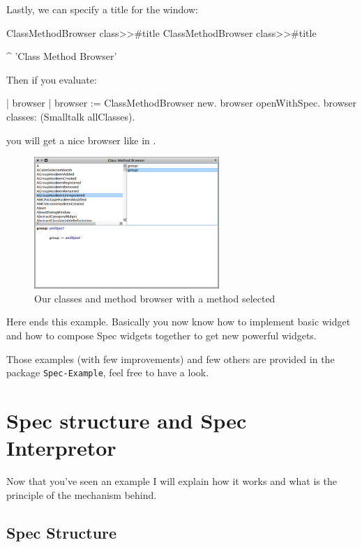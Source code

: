 \documentclass[a4paper,10pt,twoside]{book}
\begin{document}
Lastly, we can specify a title for the window:
\begin{method}{ClassMethodBrowser class>>\#title}
ClassMethodBrowser class>>#title

	^ 'Class Method Browser'
\end{method}

Then if you evaluate:

\begin{code}{}
| browser |
browser := ClassMethodBrowser new.
browser openWithSpec.
browser classes: (Smalltalk allClasses).
\end{code}

you will get a nice browser like in .


\begin{figure}[ht]
\begin{center}
	\includegraphics[width=7cm]{MethodBrowser6}
	\caption{Our classes and method browser with a method selected}
\end{center}
\end{figure}


Here ends this example. 
Basically you now know how to implement basic widget and how to compose Spec widgets together to get new powerful widgets.

Those examples (with few improvements) and few others are provided in the package \verb+Spec-Example+, feel free to have a look.

\section{Spec structure and Spec Interpretor}

Now that you've seen an example I will explain how it works and what is the principle of the mechanism behind.

\subsection{Spec Structure}
\end{document}
